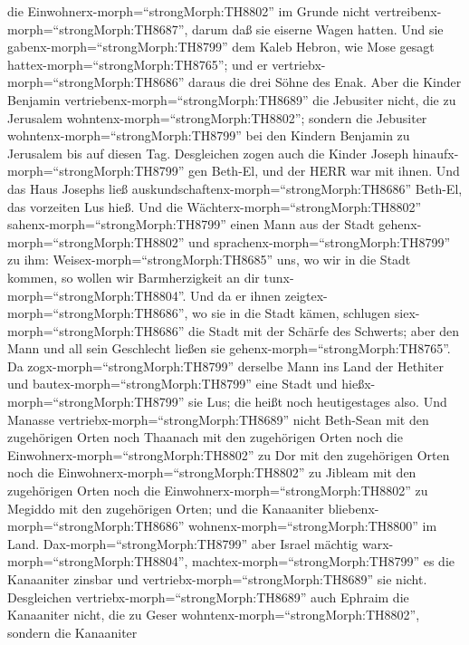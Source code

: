 die Einwohnerx-morph=``strongMorph:TH8802'' im Grunde nicht
vertreibenx-morph=``strongMorph:TH8687'', darum daß sie eiserne Wagen
hatten.  Und sie gabenx-morph=``strongMorph:TH8799'' dem
Kaleb Hebron, wie Mose gesagt hattex-morph=``strongMorph:TH8765''; und
er vertriebx-morph=``strongMorph:TH8686'' daraus die drei Söhne des
Enak.  Aber die Kinder Benjamin
vertriebenx-morph=``strongMorph:TH8689'' die Jebusiter nicht, die zu
Jerusalem wohntenx-morph=``strongMorph:TH8802''; sondern die Jebusiter
wohntenx-morph=``strongMorph:TH8799'' bei den Kindern Benjamin zu
Jerusalem bis auf diesen Tag.  Desgleichen zogen auch die
Kinder Joseph hinaufx-morph=``strongMorph:TH8799'' gen Beth-El, und der
HERR war mit ihnen.  Und das Haus Josephs ließ
auskundschaftenx-morph=``strongMorph:TH8686'' Beth-El, das vorzeiten Lus
hieß.  Und die Wächterx-morph=``strongMorph:TH8802''
sahenx-morph=``strongMorph:TH8799'' einen Mann aus der Stadt
gehenx-morph=``strongMorph:TH8802'' und
sprachenx-morph=``strongMorph:TH8799'' zu ihm:
Weisex-morph=``strongMorph:TH8685'' uns, wo wir in die Stadt kommen, so
wollen wir Barmherzigkeit an dir tunx-morph=``strongMorph:TH8804''.
 Und da er ihnen zeigtex-morph=``strongMorph:TH8686'', wo
sie in die Stadt kämen, schlugen siex-morph=``strongMorph:TH8686'' die
Stadt mit der Schärfe des Schwerts; aber den Mann und all sein
Geschlecht ließen sie gehenx-morph=``strongMorph:TH8765''. 
Da zogx-morph=``strongMorph:TH8799'' derselbe Mann ins Land der Hethiter
und bautex-morph=``strongMorph:TH8799'' eine Stadt und
hießx-morph=``strongMorph:TH8799'' sie Lus; die heißt noch heutigestages
also.  Und Manasse vertriebx-morph=``strongMorph:TH8689''
nicht Beth-Sean mit den zugehörigen Orten noch Thaanach mit den
zugehörigen Orten noch die Einwohnerx-morph=``strongMorph:TH8802'' zu
Dor mit den zugehörigen Orten noch die
Einwohnerx-morph=``strongMorph:TH8802'' zu Jibleam mit den zugehörigen
Orten noch die Einwohnerx-morph=``strongMorph:TH8802'' zu Megiddo mit
den zugehörigen Orten; und die Kanaaniter
bliebenx-morph=``strongMorph:TH8686''
wohnenx-morph=``strongMorph:TH8800'' im Land. 
Dax-morph=``strongMorph:TH8799'' aber Israel mächtig
warx-morph=``strongMorph:TH8804'', machtex-morph=``strongMorph:TH8799''
es die Kanaaniter zinsbar und vertriebx-morph=``strongMorph:TH8689'' sie
nicht.  Desgleichen vertriebx-morph=``strongMorph:TH8689''
auch Ephraim die Kanaaniter nicht, die zu Geser
wohntenx-morph=``strongMorph:TH8802'', sondern die Kanaaniter

